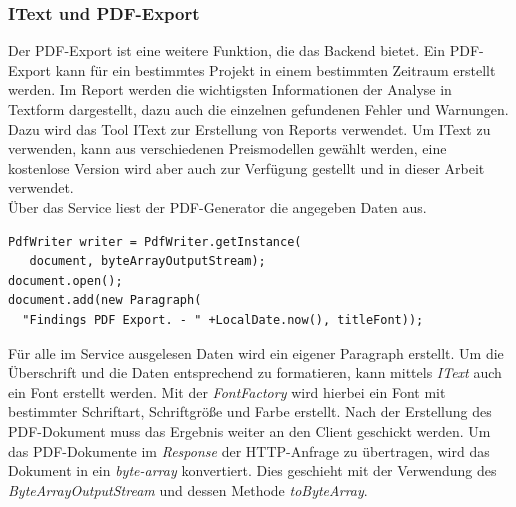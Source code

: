 \subsubsection{IText und PDF-Export}
Der PDF-Export ist eine weitere Funktion, die das Backend bietet. Ein PDF-Export kann für ein bestimmtes Projekt in einem bestimmten Zeitraum erstellt werden. Im Report werden die wichtigsten Informationen der Analyse in Textform dargestellt, dazu auch die einzelnen gefundenen Fehler und Warnungen. \\
Dazu wird das Tool IText zur Erstellung von Reports verwendet.  \cite{lowagie2011itext} Um IText zu verwenden, kann aus verschiedenen Preismodellen gewählt werden, eine kostenlose Version wird aber auch zur Verfügung gestellt und in dieser Arbeit verwendet.  \\
Über das Service liest der PDF-Generator die angegeben Daten aus.

\lstset{
  caption={Initialisierung des Writers um im Dokument einen Paragraph zu erstellen.}, 
  basicstyle=\small\ttfamily, 
  label=lst:main, 
  language=Java,
  frame=single,
  breaklines=true, %
  postbreak=\mbox{\textcolor{red}{$\hookrightarrow$}\space},
}

\begin{samepage}%
	\begin{lstlisting}[float=tbhp]
PdfWriter writer = PdfWriter.getInstance(
   document, byteArrayOutputStream);
document.open();
document.add(new Paragraph(
  "Findings PDF Export. - " +LocalDate.now(), titleFont));

	\end{lstlisting}
\end{samepage}

Für alle im Service ausgelesen Daten wird ein eigener Paragraph erstellt. Um die Überschrift und die Daten entsprechend zu formatieren, kann mittels \textit{IText} auch ein Font erstellt werden. Mit der \textit{FontFactory} wird hierbei ein Font mit bestimmter Schriftart, Schriftgröße und Farbe erstellt.
Nach der Erstellung des PDF-Dokument muss das Ergebnis weiter an den Client geschickt werden. Um das PDF-Dokumente im \textit{Response} der HTTP-Anfrage zu übertragen, wird das Dokument in ein \textit{byte-array} konvertiert. Dies geschieht mit der Verwendung des \textit{ByteArrayOutputStream} und dessen Methode \textit{toByteArray}. 

